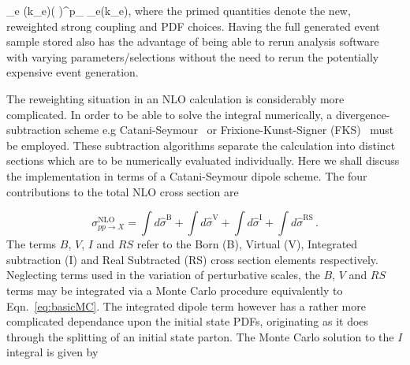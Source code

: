 \be {}_e (k_e)\to \left(   \right)^{p_{}}  \; _e(k_e), \ee
where the primed quantities denote the new, reweighted strong coupling and PDF choices. Having the full generated event sample stored also has the advantage of being able to rerun analysis software with varying parameters/selections without the need to rerun the potentially expensive event generation.

The reweighting situation in an NLO calculation is considerably more complicated. In order to be able to solve the integral numerically, a divergence-subtraction scheme e.g Catani-Seymour~\cite{Catani:1996vz}
or Frixione-Kunst-Signer (FKS)~\cite{Frixione:1995ms,Frixione:1997np} must be employed. These subtraction algorithms separate the calculation into distinct sections which are to be numerically evaluated individually. Here we shall discuss the implementation in terms of a Catani-Seymour dipole scheme. The four contributions to the total NLO cross section are 

\begin{equation}
  \label{eq:NLOxsect}
  \sigma_{pp\to X}^{\text{NLO}}= \int d\hat{\sigma}^\mathrm{B}
  + \int d\hat{\sigma}^\mathrm{V}
  + \int d\hat{\sigma}^\mathrm{I}
  + \int d\hat{\sigma}^\mathrm{RS}
  \, .
\end{equation}
The terms $B$, $V$, $I$ and $RS$ refer to the Born (B), Virtual (V), Integrated subtraction (I) and Real Subtracted (RS) cross section elements respectively. Neglecting terms used in the variation of perturbative scales, the $B$, $V$ and $RS$ terms may be integrated via a Monte Carlo procedure equivalently to Eqn.~\ref{eq:basicMC}. The integrated dipole term however has a rather more complicated dependance upon the initial state PDFs, originating as it does through the splitting of an initial state parton. The Monte Carlo solution to the $I$ integral is given by 

